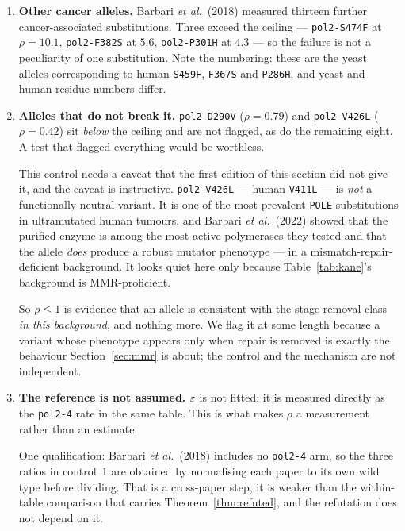 \begin{enumerate}[leftmargin=*,itemsep=2pt]
  \item \textbf{Other cancer alleles.} Barbari \emph{et al.}\ (2018) measured
        thirteen further cancer-associated substitutions. Three exceed the
        ceiling --- \texttt{pol2-S474F} at $\rho = 10.1$, \texttt{pol2-F382S} at
        $5.6$, \texttt{pol2-P301H} at $4.3$ --- so the failure is not a
        peculiarity of one substitution. Note the numbering: these are the yeast
        alleles corresponding to human \texttt{S459F}, \texttt{F367S} and
        \texttt{P286H}, and yeast and human residue numbers differ.
  \item \textbf{Alleles that do not break it.} \texttt{pol2-D290V}
        ($\rho = 0.79$) and \texttt{pol2-V426L} ($\rho = 0.42$) sit \emph{below}
        the ceiling and are not flagged, as do the remaining eight. A test that
        flagged everything would be worthless.

        This control needs a caveat that the first edition of this section did
        not give it, and the caveat is instructive. \texttt{pol2-V426L} ---
        human \texttt{V411L} --- is \emph{not} a functionally neutral variant.
        It is one of the most prevalent \texttt{POLE} substitutions in
        ultramutated human tumours, and Barbari \emph{et al.}\ (2022) showed that
        the purified enzyme is among the most active polymerases they tested and
        that the allele \emph{does} produce a robust mutator phenotype --- in a
        mismatch-repair-deficient background. It looks quiet here only because
        Table~\ref{tab:kane}'s background is MMR-proficient.

        So $\rho \le 1$ is evidence that an allele is consistent with the
        stage-removal class \emph{in this background}, and nothing more. We flag
        it at some length because a variant whose phenotype appears only when
        repair is removed is exactly the behaviour Section~\ref{sec:mmr} is
        about; the control and the mechanism are not independent.
  \item \textbf{The reference is not assumed.} $\varepsilon$ is not fitted; it is
        measured directly as the \texttt{pol2-4} rate in the same table. This is
        what makes $\rho$ a measurement rather than an estimate.

        One qualification: Barbari \emph{et al.}\ (2018) includes no
        \texttt{pol2-4} arm, so the three ratios in control~1 are obtained by
        normalising each paper to its own wild type before dividing. That is a
        cross-paper step, it is weaker than the within-table comparison that
        carries Theorem~\ref{thm:refuted}, and the refutation does not depend on
        it.
\end{enumerate}

